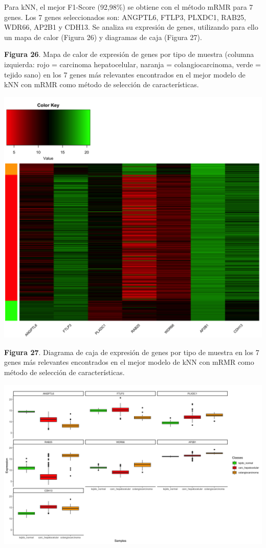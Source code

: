 Para kNN, el mejor F1-Score (92,98\%) se obtiene con el método mRMR para 7 genes. Los 7 genes seleccionados son: ANGPTL6, FTLP3, PLXDC1, RAB25, WDR66, AP2B1 y CDH13. Se analiza su expresión de genes, utilizando para ello un mapa de calor (Figura 26) y diagramas de caja (Figura 27).

\newpage
\textbf{Figura 26}. Mapa de calor de expresión de genes por tipo de muestra (columna izquierda: rojo = carcinoma hepatocelular, naranja = colangiocarcinoma, verde = tejido sano) en los 7 genes más relevantes encontrados en el mejor modelo de kNN con mRMR como método de selección de características.
\begin{center}
	\includegraphics[width=1\textwidth]{figuras/26_higado_multiclase_33_knn_heatmap_mejor_metodo.png} 
\end{center}

\newpage
\textbf{Figura 27}. Diagrama de caja de expresión de genes por tipo de muestra en los 7 genes más relevantes encontrados en el mejor modelo de kNN con mRMR como método de selección de características.
\begin{center}
	\includegraphics[width=1\textwidth]{figuras/27_higado_multiclase_34_knn_boxplots_mejor_metodo.png} 
\end{center}

